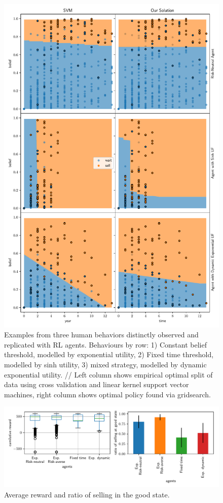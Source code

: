 
\begin{figure}
    \includegraphics[width=0.8\linewidth]{img/fit}
    \caption{Examples from three human behaviors distinctly observed and replicated with RL agents. Behaviours by row: 1) Constant belief threshold, modelled by exponential utility, 2) Fixed time threshold, modelled by sinh utility, 3) mixed strategy, modelled by dynamic exponential utility. // Left column shows empirical optimal split of data using cross validation and linear kernel support vector machines, right column shows optimal policy found via gridsearch.}
    \label{fig:svm_vs_value}
\end{figure}


\begin{figure}
\includegraphics[width=0.8\linewidth]{img/performance.pdf}
\caption{Average reward and ratio of selling in the good state.}
\end{figure}
